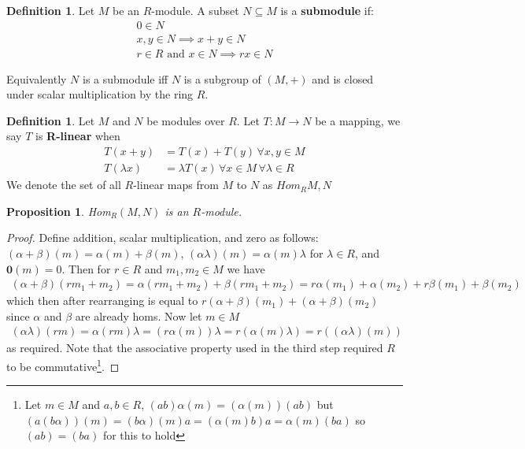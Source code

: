 \documentclass[12pt]{book}
\newtheorem{proposition}[theorem]{Proposition}
\theoremstyle{definition}
\newtheorem{definition}[theorem]{Definition}
\begin{document}
\begin{definition}
    Let $M$ be an $R$-module. A subset $N \subseteq M$ is a \textbf{submodule} if:\begin{align*}
        0 \in N \\
        x, y \in N \implies x + y \in N \\
        r \in R \text{ and } x \in N \implies rx \in N
    \end{align*}
\end{definition}
Equivalently $N$ is a submodule iff $N$ is a subgroup of $(M,+)$ and is closed under scalar multiplication by the ring $R$.

\begin{definition}
    Let $M$ and $N$ be modules over $R$. Let $T : M \rightarrow N$ be a mapping, we say $T$ is \textbf{R-linear} when 
    \begin{align*}
        T(x + y)     &= T(x) + T(y) \, \forall x, y \in M\\
        T(\lambda x) &= \lambda T(x) \, \forall x \in M \, \forall \lambda \in R
    \end{align*}
    We denote the set of all $R$-linear maps from $M$ to $N$ as $Hom_R{M,N}$
\end{definition}

\begin{proposition}
    Hom$_R(M,N)$ is an $R$-module. 
\end{proposition}
\begin{proof}
    Define addition, scalar multiplication, and zero as follows: $(\alpha + \beta)(m) = \alpha(m) + \beta(m)$, $(\alpha \lambda)(m) = \alpha(m) \lambda$ for $\lambda \in R$, and $\mathbf{0}(m) = 0$.
    Then for $r \in R$ and $m_1, m_2 \in M$ we have 
    \begin{align*}
        (\alpha + \beta)(rm_1 + m_2) = \alpha(rm_1 + m_2) + \beta(rm_1 + m_2) = r\alpha(m_1) + \alpha(m_2) + r\beta(m_1) + \beta(m_2)
    \end{align*}
    which then after rearranging is equal to $r(\alpha + \beta)(m_1) + (\alpha + \beta)(m_2)$ since $\alpha$ and $\beta$ are already homs. Now let $m \in M$
    \begin{align*}
        (\alpha \lambda)(rm) = \alpha(rm)\lambda = (r \alpha(m))\lambda = r(\alpha(m)\lambda) = r((\alpha \lambda)(m))
    \end{align*}
    as required. Note that the associative property used in the third step required $R$ to be commutative\footnote{Let $m \in M$ and $a, b \in R$, $(ab)\alpha(m) = (\alpha(m))(ab)$ but $(a(b\alpha))(m) = (b\alpha)(m)a = (\alpha(m)b)a = \alpha(m)(ba)$ so $(ab) = (ba)$ for this to hold}.
\end{proof}
\end{document}
